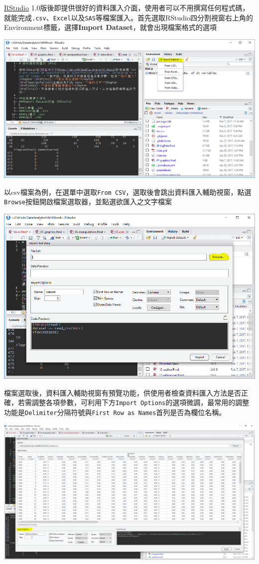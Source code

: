 \documentclass[]{book}
\theoremstyle{definition}
\theoremstyle{definition}
\theoremstyle{remark}
\begin{document}
\href{https://www.rstudio.com/}{RStudio}
1.0版後即提供很好的資料匯入介面，使用者可以不用撰寫任何程式碼，就能完成\texttt{.csv}、\texttt{Excel}以及\texttt{SAS}等檔案匯入。首先選取RStudio四分割視窗右上角的Environment標籤，選擇\textbf{Import
Dataset}，就會出現檔案格式的選項

\includegraphics[width=16.43in]{figure/import}

以csv檔案為例，在選單中選取\texttt{From\ CSV}，選取後會跳出資料匯入輔助視窗，點選\texttt{Browse}按鈕開啟檔案選取器，並點選欲匯入之文字檔案

\includegraphics[width=13.81in]{figure/csv}

檔案選取後，資料匯入輔助視窗有預覽功能，供使用者檢查資料匯入方法是否正確，若需調整各項參數，可利用下方\texttt{Import\ Options}的選項微調，最常用的調整功能是\texttt{Delimiter}分隔符號與\texttt{First\ Row\ as\ Names}首列是否為欄位名稱。

\includegraphics[width=26.67in]{figure/csv2}
\end{document}
